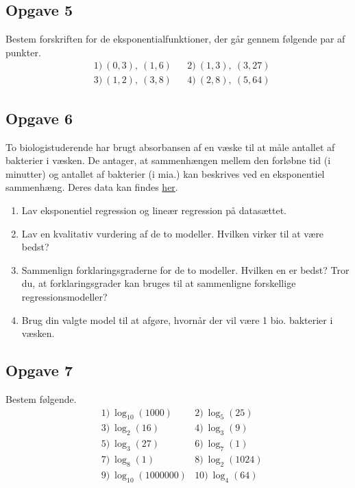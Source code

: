 \subsection*{Opgave 5}

Bestem forskriften for de eksponentialfunktioner, der går gennem følgende par af punkter.
\begin{align*}
&1) \ (0,3), \ (1,6)  &&2) \ (1,3), \ (3,27)      \\
&3) \ (1,2), \  (3,8)   &&4) \  (2,8), \ (5,64)    
\end{align*}


\subsection*{Opgave 6}

To biologistuderende har brugt absorbansen af en væske til at måle antallet af bakterier i væsken. De antager, at sammenhængen mellem den forløbne tid (i minutter) og antallet af bakterier (i mia.) kan beskrives ved en eksponentiel sammenhæng. Deres data kan findes \href{https://github.com/ChristianJLex/TeachingNotes/raw/master/2022-2023/Data%20og%20lign/Bakteriedata.xlsx}{\color{blue!60} her}.

\begin{enumerate}[label=\roman*)]
	\item Lav eksponentiel regression og lineær regression på datasættet.
	\item Lav en kvalitativ vurdering af de to modeller. Hvilken virker til at være bedst?
	\item Sammenlign forklaringsgraderne for de to modeller. Hvilken en er bedst? Tror du, at forklaringsgrader kan bruges til at sammenligne forskellige regressionsmodeller?
	\item Brug din valgte model til at afgøre, hvornår der vil være 1 bio. bakterier i væsken. 
\end{enumerate}

\subsection*{Opgave 7}

Bestem følgende.
\begin{align*}
	&1) \  \log_{10}(1000)      &2) \  \log_5(25)       \\
	&3) \  \log_2(16)       &4) \ \log_3(9)         \\
	&5) \  \log_3(27)      &6) \  \log_7(1)      \\
	&7) \  \log_8(1)      &8) \  \log_2(1024)      \\
	&9) \  \log_{10}(1000000)     &10) \  \log_4(64)        \\
\end{align*}

